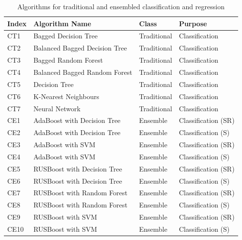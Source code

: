 \documentclass[final,1p,times,twocolumn]{elsarticle}
\begin{document}
\begin{table}[!t]
\scriptsize
\caption{Algorithms for traditional and ensembled classification and regression}
\label{table:algos}
\centering
{
\begin{tabular}{| l | l | l | l | }
\hline
\textbf{Index} & \textbf{Algorithm Name} & \textbf{Class} & \textbf{Purpose} \\
\hline
CT1 & Bagged Decision Tree & Traditional & Classification \\
\hline
CT2 & Balanced Bagged Decision Tree & Traditional &  Classification \\
\hline
CT3 & Bagged Random Forest & Traditional &  Classification \\
\hline
CT4 & Balanced Bagged Random Forest & Traditional & Classification \\
\hline
CT5 & Decision Tree & Traditional & Classification \\
\hline
CT6 & K-Nearest Neighbours & Traditional & Classification \\
\hline
CT7 & Neural Network & Traditional & Classification \\
\hline
CE1 & AdaBoost with Decision Tree & Ensemble & Classification (SR)\\
\hline
CE2 & AdaBoost with Decision Tree & Ensemble & Classification (S)\\
\hline
CE3 & AdaBoost with SVM & Ensemble & Classification (SR)\\
\hline
CE4 & AdaBoost with SVM & Ensemble & Classification (S)\\
\hline
CE5 & RUSBoost with Decision Tree & Ensemble & Classification (SR)\\
\hline
CE6 & RUSBoost with Decision Tree & Ensemble & Classification (S)\\
\hline
CE7 & RUSBoost with Random Forest & Ensemble & Classification (SR)\\
\hline
CE8 & RUSBoost with Random Forest & Ensemble & Classification (S)\\
\hline
CE9 & RUSBoost with SVM & Ensemble & Classification (SR)\\
\hline
CE10 & RUSBoost with SVM & Ensemble & Classification (S)\\
\hline
\end{tabular}
}
\end{table}
\end{document}
